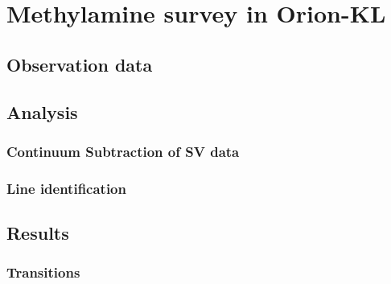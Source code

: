 \chapter{Methylamine survey in Orion-KL
\label{chap:Orion-KL}}

\section{Observation data}

\section{Analysis}
\subsection{Continuum Subtraction of SV data}


\subsection{Line identification}

\section{Results}
\subsection{Transitions}


